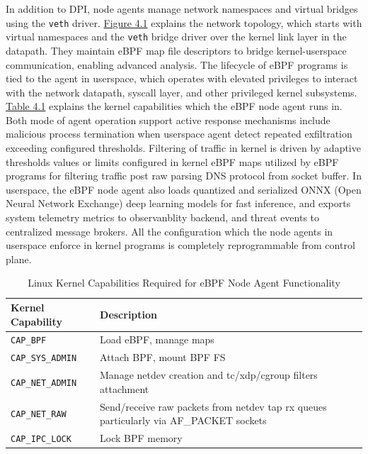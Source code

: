 \documentclass [11pt, proquest] {uwthesis}[2020/02/24]
\begin{document}
In addition to DPI, node agents manage network namespaces and virtual bridges using the \texttt{veth} driver. \hyperref[sec:dp_eBPF_agent_net_topology]{Figure 4.1} explains the network topology, which starts with virtual namespaces and the \texttt{veth} bridge driver over the kernel link layer in the datapath. They maintain eBPF map file descriptors to bridge kernel-userspace communication, enabling advanced analysis. The lifecycle of eBPF programs is tied to the agent in userspace, which operates with elevated privileges to interact with the network datapath, syscall layer, and other privileged kernel subsystems. \hyperref[sec:dp_kernel_cap]{Table 4.1} explains the kernel capabilities which the eBPF node agent runs in. Both mode of agent operation support active response mechanisms include malicious process termination when userspace agent detect repeated exfiltration exceeding configured thresholds. Filtering of traffic in kernel is driven by adaptive thresholds values or limits configured in kernel eBPF maps utilized by eBPF programs for filtering traffic post raw parsing DNS protocol from socket buffer. In userspace, the eBPF node agent also loads quantized and serialized ONNX (Open Neural Network Exchange) deep learning models for fast inference, and exports system telemetry metrics to observanblity backend, and threat events to centralized message brokers. All the configuration which the node agents in userspace enforce in kernel programs is completely reprogrammable from control plane.


\begin{table}[H]
\centering
\begin{tabular}{|l|p{10cm}|}
\hline
\textbf{Kernel Capability} & \textbf{Description} \\
\hline
\texttt{CAP\_BPF} & Load eBPF, manage maps \\
\hline
\texttt{CAP\_SYS\_ADMIN} & Attach BPF, mount BPF FS \\
\hline
\texttt{CAP\_NET\_ADMIN} & Manage netdev creation and tc/xdp/cgroup filters attachment \\
\hline
\texttt{CAP\_NET\_RAW} & Send/receive raw packets from netdev tap rx queues particularly via AF\_PACKET sockets  \\
\hline
\texttt{CAP\_IPC\_LOCK} & Lock BPF memory \\
\hline
\end{tabular}
\caption{Linux Kernel Capabilities Required for eBPF Node Agent Functionality}
\label{sec:dp_kernel_cap}
\end{table}
\end{document}

